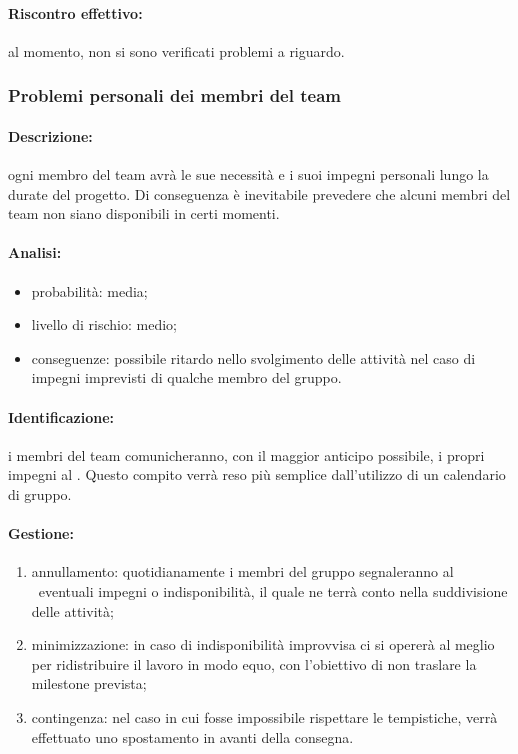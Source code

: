 \documentclass[../PianoProgetto.tex]{subfiles}
\begin{document}
	\paragraph*{Riscontro effettivo:} al momento, non si sono verificati problemi a riguardo.

\subsubsection{Problemi personali dei membri del team}

	\paragraph*{Descrizione:} ogni membro del team avrà le sue necessità e i suoi impegni personali lungo la durate del progetto. Di conseguenza è inevitabile prevedere che alcuni membri del team non siano disponibili in certi momenti.
	 
	\paragraph*{Analisi:}
	\begin{itemize}
		\item probabilità: media;
		\item livello di rischio: medio;
		\item conseguenze: possibile ritardo nello svolgimento delle attività nel caso di impegni imprevisti di qualche membro del gruppo.
	\end{itemize}	
		
	\paragraph*{Identificazione:} i membri del team comunicheranno, con il maggior anticipo possibile, i propri impegni al \responsabilediprogetto . Questo compito verrà reso più semplice dall'utilizzo di un calendario di gruppo. 
	
	\paragraph*{Gestione:}
	\begin{enumerate}
		\item annullamento: quotidianamente i membri del gruppo segnaleranno al \responsabilediprogetto\ eventuali impegni o indisponibilità, il quale ne terrà conto nella suddivisione delle attività;
		\item minimizzazione: in caso di indisponibilità improvvisa ci si opererà al meglio per ridistribuire il lavoro in modo equo, con l'obiettivo di non traslare la milestone prevista;
		\item contingenza: nel caso in cui fosse impossibile rispettare le tempistiche, verrà effettuato uno spostamento in avanti della consegna.
	\end{enumerate}
			
\end{document}
